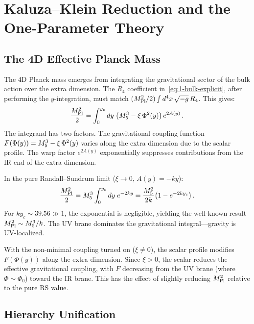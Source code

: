 \section{Kaluza--Klein Reduction and the One-Parameter Theory}
\label{sec:1-kk}

\subsection{The 4D Effective Planck Mass}
\label{sec:1-planck}

The 4D Planck mass emerges from integrating the gravitational sector of the bulk action over the extra dimension. The $R_4$ coefficient in~\eqref{eq:1-bulk-explicit}, after performing the $y$-integration, must match $(M_{\mathrm{Pl}}^2/2)\int d^4x\, \sqrt{-g}\, R_4$. This gives:
\begin{equation}
\label{eq:1-mpl}
\frac{M_{\mathrm{Pl}}^2}{2} = \int_0^{y_c} dy\; \bigl(M_5^3 - \xi\,\Phi^2(y)\bigr)\, e^{2A(y)}\,.
\end{equation}
The integrand has two factors. The gravitational coupling function $F(\Phi(y)) = M_5^3 - \xi\,\Phi^2(y)$ varies along the extra dimension due to the scalar profile. The warp factor $e^{2A(y)}$ exponentially suppresses contributions from the IR end of the extra dimension.

In the pure Randall--Sundrum limit ($\xi \to 0$, $A(y) = -ky$):
\begin{equation}
\label{eq:1-mpl-rs}
\frac{M_{\mathrm{Pl}}^2}{2} = M_5^3 \int_0^{y_c} dy\; e^{-2ky}
= \frac{M_5^3}{2k}\bigl(1 - e^{-2ky_c}\bigr)\,.
\end{equation}
For $ky_c \sim 39.56 \gg 1$, the exponential is negligible, yielding the well-known result $M_{\mathrm{Pl}}^2 \sim M_5^3/k$. The UV brane dominates the gravitational integral---gravity is UV-localized.

With the non-minimal coupling turned on ($\xi \neq 0$), the scalar profile modifies $F(\Phi(y))$ along the extra dimension. Since $\xi > 0$, the scalar reduces the effective gravitational coupling, with $F$ decreasing from the UV brane (where $\Phi \sim \Phi_0$) toward the IR brane. This has the effect of slightly reducing $M_{\mathrm{Pl}}^2$ relative to the pure RS value.

\subsection{Hierarchy Unification}
\label{sec:1-hierarchy}

